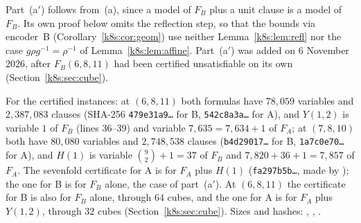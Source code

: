 Part~(a$'$) follows from~(a), since a model of $F_B$ plus a unit clause is a model of $F_B$. Its own proof below omits
the reflection step, so that the bounds via encoder~B (Corollary~\ref{k8s:cor:geom}) use neither
Lemma~\ref{k8s:lem:refl} nor the case $g\rho g^{-1}=\rho^{-1}$ of Lemma~\ref{k8s:lem:affine}. Part~(a$'$) was added on
6 November 2026, after $F_B(6,8,11)$ had been certified unsatisfiable on its own (Section~\ref{k8s:sec:cube}).

For the certified instances: at $(6,8,11)$ both formulas have $78{,}059$ variables and $2{,}387{,}083$ clauses
(SHA-256 \texttt{479e31a9\dots} for B, \texttt{542c8a3a\dots} for A), and $Y(1,2)$ is variable $1$ of $F_B$ (lines 36--39)
and variable $7{,}635=7{,}634+1$ of $F_A$; at $(7,8,10)$ both have $80{,}080$ variables and $2{,}748{,}538$ clauses
(\texttt{b4d29017\dots} for B, \texttt{1a7c0e70\dots} for A), and $H(1)$ is variable $\binom92+1=37$ of $F_B$ and
$7{,}820+36+1=7{,}857$ of $F_A$. The sevenfold certificate for A is for $F_A$ plus $H(1)$ (\texttt{fa297b5b\dots}, made
by ); the one for B is for $F_B$ alone, the case of part~(a$'$). At $(6,8,11)$ the
certificate for B is also for $F_B$ alone, through $64$ cubes, and the one for A is for $F_A$ plus $Y(1,2)$, through
$32$ cubes (Section~\ref{k8s:sec:cube}). Sizes and hashes:
, , .

